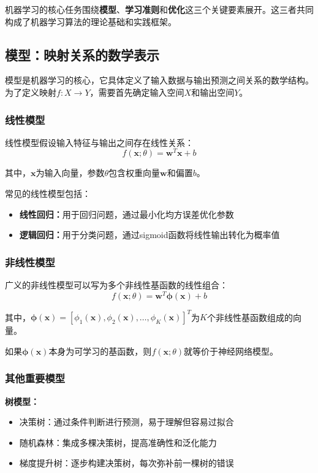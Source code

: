 机器学习的核心任务围绕\textbf{模型}、\textbf{学习准则}和\textbf{优化}这三个关键要素展开。这三者共同构成了机器学习算法的理论基础和实践框架。

\subsection{模型：映射关系的数学表示}

模型是机器学习的核心，它具体定义了输入数据与输出预测之间关系的数学结构。为了定义映射$f: X \rightarrow Y$，需要首先确定输入空间$X$和输出空间$Y$。

\subsubsection{线性模型}

线性模型假设输入特征与输出之间存在线性关系：
$$f(\mathbf{x}; \theta) = \mathbf{w}^T\mathbf{x} + b$$

其中，$\mathbf{x}$为输入向量，参数$\theta$包含权重向量$\mathbf{w}$和偏置$b$。

常见的线性模型包括：
\begin{itemize}
\item \textbf{线性回归：}用于回归问题，通过最小化均方误差优化参数
\item \textbf{逻辑回归：}用于分类问题，通过sigmoid函数将线性输出转化为概率值
\end{itemize}

\subsubsection{非线性模型}

广义的非线性模型可以写为多个非线性基函数的线性组合：
$$f(\mathbf{x}; \theta) = \mathbf{w}^T \boldsymbol{\phi}(\mathbf{x}) + b$$

其中，$\boldsymbol{\phi}(\mathbf{x}) = [\phi_1(\mathbf{x}), \phi_2(\mathbf{x}), \ldots, \phi_K(\mathbf{x})]^T$为$K$个非线性基函数组成的向量。

如果$\boldsymbol{\phi}(\mathbf{x})$本身为可学习的基函数，则$f(\mathbf{x};\theta)$就等价于神经网络模型。

\subsubsection{其他重要模型}

\textbf{树模型：}
\begin{itemize}
\item 决策树：通过条件判断进行预测，易于理解但容易过拟合
\item 随机森林：集成多棵决策树，提高准确性和泛化能力
\item 梯度提升树：逐步构建决策树，每次弥补前一棵树的错误
\end{itemize}

